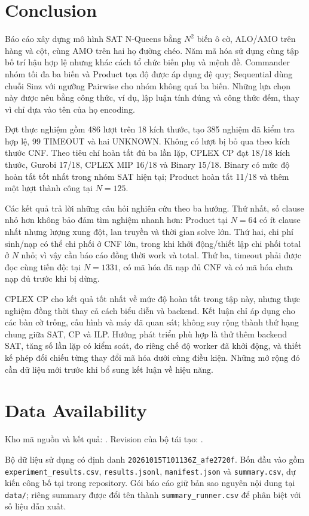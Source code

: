 \section{Conclusion}
\label{sec:conclusion}
Báo cáo xây dựng mô hình SAT N-Queens bằng $N^2$ biến ô cờ, ALO/AMO trên hàng và cột, cùng AMO trên hai họ đường chéo. Năm mã hóa sử dụng cùng tập bố trí hậu hợp lệ nhưng khác cách tổ chức biến phụ và mệnh đề. Commander nhóm tối đa ba biến và Product tọa độ được áp dụng đệ quy; Sequential dùng chuỗi Sinz với ngưỡng Pairwise cho nhóm không quá ba biến. Những lựa chọn này được nêu bằng công thức, ví dụ, lập luận tính đúng và công thức đếm, thay vì chỉ dựa vào tên của họ encoding.

Đợt thực nghiệm gồm 486 lượt trên 18 kích thước, tạo 385 nghiệm đã kiểm tra hợp lệ, 99 TIMEOUT và hai UNKNOWN. Không có lượt bị bỏ qua theo kích thước CNF. Theo tiêu chí hoàn tất đủ ba lần lặp, CPLEX CP đạt 18/18 kích thước, Gurobi 17/18, CPLEX MIP 16/18 và Binary 15/18. Binary có mức độ hoàn tất tốt nhất trong nhóm SAT hiện tại; Product hoàn tất 11/18 và thêm một lượt thành công tại $N=125$.

Các kết quả trả lời những câu hỏi nghiên cứu theo ba hướng. Thứ nhất, số clause nhỏ hơn không bảo đảm tìm nghiệm nhanh hơn: Product tại $N=64$ có ít clause nhất nhưng lượng xung đột, lan truyền và thời gian solve lớn. Thứ hai, chi phí sinh/nạp có thể chi phối ở CNF lớn, trong khi khởi động/thiết lập chi phối total ở $N$ nhỏ; vì vậy cần báo cáo đồng thời work và total. Thứ ba, timeout phải được đọc cùng tiến độ: tại $N=1331$, có mã hóa đã nạp đủ CNF và có mã hóa chưa nạp đủ trước khi bị dừng.

CPLEX CP cho kết quả tốt nhất về mức độ hoàn tất trong tập này, nhưng thực nghiệm đồng thời thay cả cách biểu diễn và backend. Kết luận chỉ áp dụng cho các bàn cờ trống, cấu hình và máy đã quan sát; không suy rộng thành thứ hạng chung giữa SAT, CP và ILP. Hướng phát triển phù hợp là thử thêm backend SAT, tăng số lần lặp có kiểm soát, đo riêng chế độ worker đã khởi động, và thiết kế phép đối chiếu từng thay đổi mã hóa dưới cùng điều kiện. Những mở rộng đó cần dữ liệu mới trước khi bổ sung kết luận về hiệu năng.

\section*{Data Availability}
Kho mã nguồn và kết quả: \RepositoryURL. Revision của bộ tái tạo: \RepositoryRevision.

Bộ dữ liệu sử dụng có định danh \texttt{20261015T101136Z\_afe2720f}. Bốn đầu vào gồm \texttt{experiment\_results.csv}, \texttt{results.jsonl}, \texttt{manifest.json} và \texttt{summary.csv}, dự kiến công bố tại  trong repository. Gói báo cáo giữ bản sao nguyên nội dung tại \texttt{data/}; riêng summary được đổi tên thành \texttt{summary\_runner.csv} để phân biệt với số liệu dẫn xuất.

